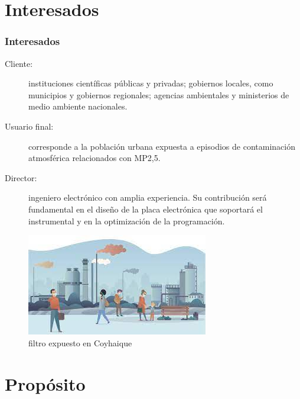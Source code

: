 \documentclass[aspectratio=169]{beamer}
\begin{document}
\section{Interesados}

\begin{frame}
	\frametitle{Interesados}

\begin{description}	
\item [Cliente:] instituciones científicas públicas y privadas; gobiernos locales, como municipios y gobiernos regionales; agencias ambientales y ministerios de medio ambiente nacionales.
\item [Usuario final:] corresponde a la población urbana expuesta a episodios de contaminación atmosférica relacionados con MP2,5.
\item [Director:] ingeniero electrónico con amplia experiencia. Su contribución será fundamental en el diseño de la placa electrónica que soportará el instrumental y en la optimización de la programación.
\end{description}	
	\begin{figure}
		\centering
		\includegraphics[width=0.5\linewidth]{images/calidadaire}
		\caption{filtro expuesto en Coyhaique}
		\label{fig:proceso-computacion-fisica}
	\end{figure}
	
	
\end{frame}

\section{Propósito}
\end{document}
